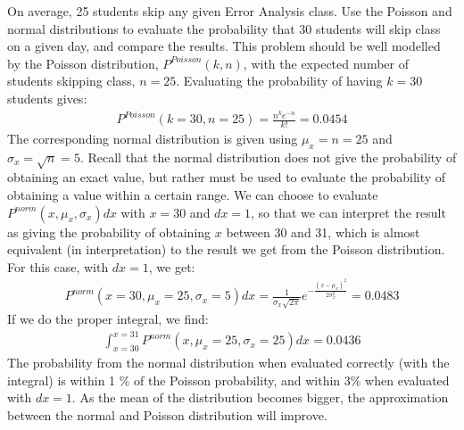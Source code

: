 \begin{example}{}{On average, 25 students skip any given Error Analysis class. Use the Poisson and normal distributions to evaluate the probability that 30 students will skip class on a given day, and compare the results.}{}
This problem should be well modelled by the Poisson distribution, $P^{Poisson}(k,n)$, with the expected number of students skipping class, $n=25$. Evaluating the probability of having $k=30$ students gives:
\begin{align*}
P^{Poisson}(k=30,n=25)=\frac{n^k e^{-n}}{k!} =0.0454
\end{align*}
The corresponding normal distribution is given using $\mu_x=n=25$ and $\sigma_x=\sqrt{n}=5$. Recall that the normal distribution does not give the probability of obtaining an exact value, but rather must be used to evaluate the probability of obtaining a value within a certain range. We can choose to evaluate $P^{norm}(x,\mu_x,\sigma_x)dx$ with $x=30$ and $dx=1$, so that we can interpret the result as giving the probability of obtaining $x$ between 30 and 31, which is almost equivalent (in interpretation) to the result we get from the Poisson distribution. For this case, with $dx=1$, we get:
\begin{align*}
P^{norm}(x=30,\mu_x=25,\sigma_x=5)dx=\frac{1}{\sigma_x\sqrt{2\pi}}e^{-\frac{(x-\mu_x)^2}{2\sigma_x^2}}=0.0483
\end{align*}
If we do the proper integral, we find:
\begin{align*}
\int_{x=30}^{x=31}P^{norm}(x,\mu_x=25,\sigma_x=25)dx=0.0436
\end{align*}
The probability from the normal distribution when evaluated correctly (with the integral) is within 1 \% of the Poisson probability, and within 3\% when evaluated with $dx=1$. As the mean of the distribution becomes bigger, the approximation between the normal and Poisson distribution will improve.
\end{example}

